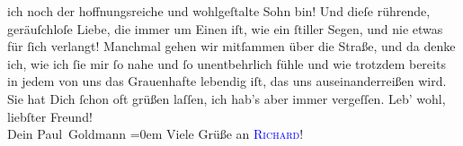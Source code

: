                ich noch der hoffnungsreiche und wohlgeſtalte Sohn bin! Und dieſe rührende,
               geräuſchloſe Liebe, die immer um Einen iſt, wie ein ſtiller Segen, und nie etwas für
               ſich verlangt! Manchmal gehen wir mitſammen über die Straße, und da denke ich, wie
                   ich ſie mir ſo nahe und ſo unentbehrlich
               fühle und wie trotzdem bereits in jedem von uns das Grauenhafte lebendig iſt, das uns
               auseinanderreißen wird.\pend
           \pstart
           Sie hat Dich ſchon oft grüßen laſſen, ich hab’s aber immer vergeſſen.\pend
           \pstart
           Leb' wohl, liebſter Freund! {\\[\baselineskip]}Dein \spacefill\mbox{Paul Goldmann}\pend
           \leftskip=0em{}\pstart
           \noindent{}Viele Grüße an \textsc{\textcolor{blue}{Richard}{}\ledrightnote{\textcolor{blue}{Richard Beer-Hofmann}}}!\pend
           \endnumbering{}\begin{anhang}\end{anhang}
      